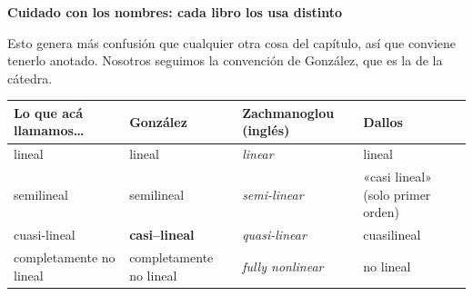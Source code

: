 \documentclass[
  spanish,
  a4paper,
]{scrbook}
\newcounter{none} %
\theoremstyle{definition}
\theoremstyle{plain}
\theoremstyle{definition}
\theoremstyle{plain}
\theoremstyle{definition}
\theoremstyle{remark}
\begin{document}
\begin{tcolorbox}[enhanced jigsaw, arc=.35mm, bottomrule=.15mm, breakable, colback=white, colframe=quarto-callout-warning-color-frame, left=2mm, leftrule=.75mm, opacityback=0, rightrule=.15mm, toprule=.15mm]
\begin{minipage}[t]{5.5mm}
\textcolor{quarto-callout-warning-color}{\faExclamationTriangle}
\end{minipage}%
\begin{minipage}[t]{\textwidth - 5.5mm}

\vspace{-3mm}\textbf{Cuidado con los nombres: cada libro los usa distinto}\vspace{3mm}

Esto genera más confusión que cualquier otra cosa del capítulo, así que
conviene tenerlo anotado. Nosotros seguimos la convención de González,
que es la de la cátedra.

{\def\LTcaptype{none} %
\begin{longtable}[]{@{}
  >{\raggedright\arraybackslash}p{}
  >{\raggedright\arraybackslash}p{}
  >{\raggedright\arraybackslash}p{}
  >{\raggedright\arraybackslash}p{}@{}}
\toprule\noalign{}
\begin{minipage}[b]{\linewidth}\raggedright
Lo que acá llamamos\ldots{}
\end{minipage} & \begin{minipage}[b]{\linewidth}\raggedright
González
\end{minipage} & \begin{minipage}[b]{\linewidth}\raggedright
Zachmanoglou (inglés)
\end{minipage} & \begin{minipage}[b]{\linewidth}\raggedright
Dallos
\end{minipage} \\
\midrule\noalign{}
\endhead
\bottomrule\noalign{}
\endlastfoot
lineal & lineal & \emph{linear} & lineal \\
semilineal & semilineal & \emph{semi-linear} & «casi lineal» (solo
primer orden) \\
cuasi-lineal & \textbf{casi--lineal} & \emph{quasi-linear} &
cuasilineal \\
completamente no lineal & completamente no lineal & \emph{fully
nonlinear} & no lineal \\
\end{longtable}
}


\end{minipage}
\end{tcolorbox}
\end{document}
